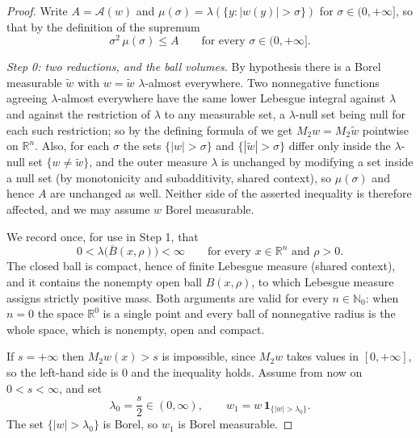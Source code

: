 \begin{proof}
Write $A = \mathcal A(w)$ and
$\mu(\sigma) = \lambda(\{y : |w(y)| > \sigma\})$ for $\sigma \in (0,+\infty]$,
so that by the definition of the supremum
\begin{equation*}
  \sigma^2\,\mu(\sigma) \leq A \qquad\text{for every } \sigma \in (0,+\infty] .
  \tag{1}
\end{equation*}

\emph{Step 0: two reductions, and the ball volumes.}
By hypothesis there is a Borel measurable $\widetilde w$ with
$w = \widetilde w$ $\lambda$-almost everywhere.  Two nonnegative functions
agreeing $\lambda$-almost everywhere have the same lower Lebesgue integral
against $\lambda$ and against the restriction of $\lambda$ to any measurable
set, a $\lambda$-null set being null for each such restriction; so by the
defining formula of  we get
$M_2w = M_2\widetilde w$ pointwise on $\mathbb{R}^n$.  Also, for each $\sigma$
the sets $\{|w| > \sigma\}$ and $\{|\widetilde w| > \sigma\}$ differ only
inside the $\lambda$-null set $\{w \neq \widetilde w\}$, and the outer
measure $\lambda$ is unchanged by modifying a set inside a null set (by
monotonicity and subadditivity, shared context), so $\mu(\sigma)$ and hence
$A$ are unchanged as well.  Neither side of the asserted inequality is therefore
affected, and we may assume $w$ Borel measurable.

We record once, for use in Step 1, that
\begin{equation*}
  0 < \lambda\bigl(\overline B(x,\rho)\bigr) < \infty
  \qquad\text{for every } x \in \mathbb{R}^n \text{ and } \rho > 0 . \tag{$*$}
\end{equation*}
The closed ball is compact, hence of finite Lebesgue measure (shared context),
and it contains the nonempty open ball $B(x,\rho)$, to which Lebesgue measure
assigns strictly positive mass.  Both arguments are valid for every
$n \in \mathbb{N}_0$: when $n = 0$ the space $\mathbb{R}^0$ is a single point
and every ball of nonnegative radius is the whole space, which is nonempty,
open and compact.

If $s = +\infty$ then $M_2w(x) > s$ is impossible, since $M_2w$ takes values in
$[0,+\infty]$, so the left-hand side is $0$ and the inequality holds.  Assume
from now on $0 < s < \infty$, and set
\[
  \lambda_0 = \frac s2 \in (0,\infty),
  \qquad
  w_1 = w\,\mathbf 1_{\{|w| > \lambda_0\}} .
\]
The set $\{|w| > \lambda_0\}$ is Borel, so $w_1$ is Borel measurable.


\end{proof}
